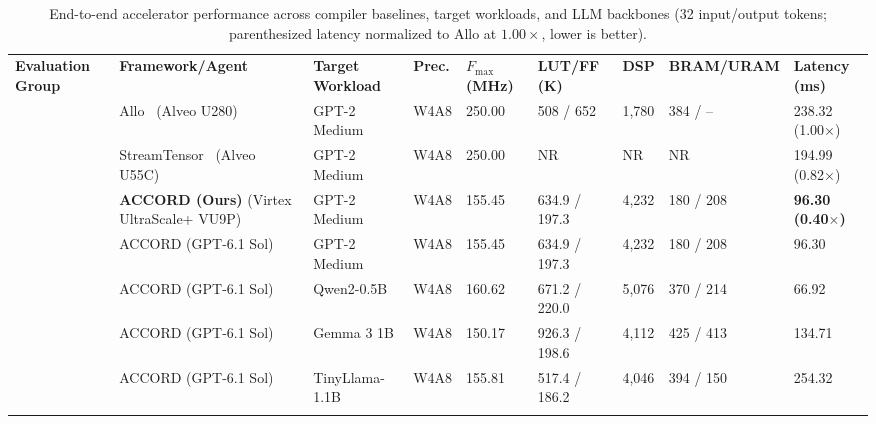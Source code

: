 \documentclass[9pt,conference]{IEEEtran}
\begin{document}
\begin{table}[t]
\centering
\caption{End-to-end accelerator performance across compiler baselines, target workloads, and LLM backbones (32 input/output tokens; parenthesized latency normalized to Allo at $1.00\times$, lower is better).}
\label{tab:e2e_main}

\fontsize{6.3}{7.7}\selectfont
\newcommand{\tablehead}[1]{{\fontsize{7}{8.5}\selectfont\bfseries #1}}

\renewcommand{\arraystretch}{1.35}
\setlength{\tabcolsep}{1.5pt}
\setlength{\arrayrulewidth}{0.30pt}

\begin{tabularx}{\textwidth}{@{}
C{2.80cm}|
>{\raggedright\arraybackslash}X|
C{1.95cm}|
C{0.75cm}|
C{1.45cm}|
C{1.45cm}|
C{0.70cm}|
C{1.65cm}|
C{1.75cm}@{}}
\tablehead{Evaluation Group} &
\tablehead{Framework/Agent} &
\tablehead{Target Workload} &
\tablehead{Prec.} &
\tablehead{$F_{\max}$ (MHz)} &
\tablehead{LUT/FF (K)} &
\tablehead{DSP} &
\tablehead{BRAM/URAM} &
\tablehead{Latency (ms)} \\

& Allo~\cite{allo} (Alveo U280)
& GPT-2 Medium
& W4A8
& 250.00
& 508 / 652
& 1,780
& 384 / --
& 238.32 (1.00$\times$) \\
& StreamTensor~\cite{streamtensor} (Alveo U55C)
& GPT-2 Medium
& W4A8
& 250.00
& NR
& NR
& NR
& 194.99 (0.82$\times$) \\
& \textbf{ACCORD (Ours)} (Virtex UltraScale+ VU9P)
& GPT-2 Medium
& W4A8
& 155.45
& 634.9 / 197.3
& 4,232
& 180 / 208
& \textbf{96.30 (0.40$\times$)} \\

& ACCORD (GPT-6.1 Sol)
& GPT-2 Medium
& W4A8
& 155.45
& 634.9 / 197.3
& 4,232
& 180 / 208
& 96.30 \\
& ACCORD (GPT-6.1 Sol)
& Qwen2-0.5B
& W4A8
& 160.62
& 671.2 / 220.0
& 5,076
& 370 / 214
& 66.92 \\
& ACCORD (GPT-6.1 Sol)
& Gemma 3 1B
& W4A8
& 150.17
& 926.3 / 198.6
& 4,112
& 425 / 413
& 134.71 \\
& ACCORD (GPT-6.1 Sol)
& TinyLlama-1.1B
& W4A8
& 155.81
& 517.4 / 186.2
& 4,046
& 394 / 150
& 254.32 \\


\end{tabularx}
\end{table}
\end{document}
